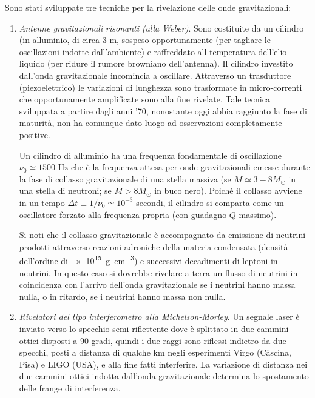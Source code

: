 Sono stati sviluppate tre tecniche per la rivelazione delle onde gravitazionali:
\begin{enumerate}
\item \emph{Antenne gravitazionali risonanti (alla Weber)}.  Sono costituite da
  un cilindro (in alluminio, di circa 3 m, sospeso opportunamente (per tagliare
  le oscillazioni indotte dall'ambiente) e raffreddato all temperatura dell'elio
  liquido (per ridure il rumore browniano dell'antenna).  Il cilindro investito
  dall'onda gravitazionale incomincia a oscillare.  Attraverso un trasduttore
  (piezoelettrico) le variazioni di lunghezza sono trasformate in micro-correnti che
  opportunamente amplificate sono alla fine rivelate.  Tale tecnica sviluppata
  a partire dagli anni '70, nonostante oggi abbia raggiunto la fase di maturità,
  non ha comunque dato luogo ad osservazioni completamente positive.

  Un cilindro di alluminio ha una frequenza fondamentale di oscillazione
  $\nu_0 \simeq 1500$ Hz che è la frequenza attesa per onde gravitazionali
  emesse durante la fase di collasso gravitazionale di una stella massiva (se
  $M \simeq 3-8 M_{\odot}$ in una stella di neutroni; se $M > 8 M_{\odot}$ in buco
  nero).  Poiché il collasso avviene in un tempo
  $\Delta t \equiv 1/\nu_0 \simeq 10^{-3}$ secondi, il cilindro si comparta come
  un oscillatore forzato alla frequenza propria (con guadagno $Q$ massimo).

  Si noti che il collasso gravitazionale è accompagnato da emissione di neutrini
  prodotti attraverso reazioni adroniche della materia condensata (densità
  dell'ordine di \SI{e15}{\gram \per \centi \metre \cubed}) e successivi
  decadimenti di leptoni in neutrini.  In questo caso si dovrebbe rivelare a
  terra un flusso di neutrini in coincidenza con l'arrivo dell'onda
  gravitazionale se i neutrini hanno massa nulla, o in ritardo, se i neutrini
  hanno massa non nulla.

\item \emph{Rivelatori del tipo interferometro alla Michelson-Morley}.  Un
  segnale laser è inviato verso lo specchio semi-riflettente dove è splittato in
  due cammini ottici disposti a 90 gradi, quindi i due raggi sono riflessi
  indietro da due specchi, posti a distanza di qualche km negli esperimenti
  Virgo (Càscina, Pisa) e LIGO (USA), e alla fine fatti interferire.  La
  variazione di distanza nei due cammini ottici indotta dall'onda gravitazionale
  determina lo spostamento delle frange di interferenza.


\end{enumerate}
